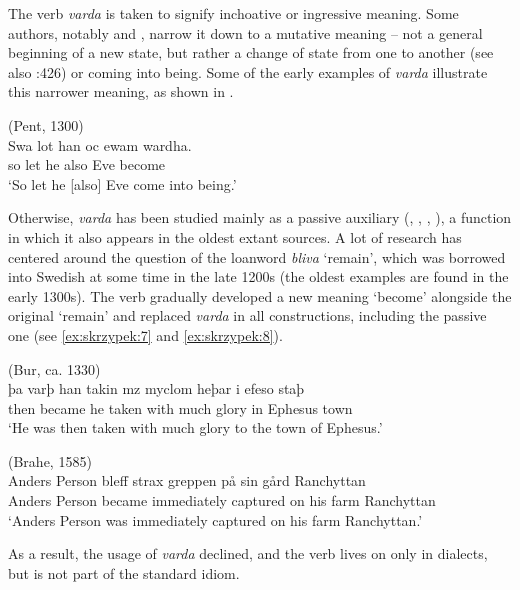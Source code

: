 \documentclass[output=paper,colorlinks,citecolor=brown]{langscibook}
\begin{document}
The verb \textit{varda} is taken to signify inchoative or ingressive meaning. Some authors, notably \citet{Toyota2009} and \citet{Propst2001}, narrow it down to a mutative meaning – not a general beginning of a new state, but rather a change of state from one to another (see also \cite{Denison1993}:426) or coming into being. Some of the early examples of \textit{varda} illustrate this narrower meaning, as shown in . 

\ea \label{ex:skrzypek:6}
    (Pent, 1300)\\
    \gll Swa lot han oc ewam wardha.\\
    so let he also Eve become\\
    \glt ‘So let he [also] Eve come into being.’
\z

Otherwise, \textit{varda} has been studied mainly as a passive auxiliary (\cite{Markey1969}, \cite{Elmevik1970}, \cite{Skrzypek2020}, \cite{Skrzypek2024}), a function in which it also appears in the oldest extant sources. A lot of research has centered around the question of the loanword \textit{bliva} ‘remain’, which was borrowed into Swedish at some time in the late 1200s (the oldest examples are found in the early 1300s). The verb gradually developed a new meaning ‘become’ alongside the original ‘remain’ and replaced \textit{varda} in all constructions, including the passive one (see \ref{ex:skrzypek:7} and \ref{ex:skrzypek:8}). 

\ea \label{ex:skrzypek:7}
    (Bur, ca. 1330)\\
    \gll þa varþ han takin mz myclom heþar i efeso staþ\\
    then became he taken with much glory in Ephesus town\\
    \glt ‘He was then taken with much glory to the town of Ephesus.’
\z

\ea \label{ex:skrzypek:8}
    (Brahe, 1585)\\
    \gll Anders Person bleff strax greppen på sin gård Ranchyttan\\
    Anders Person became immediately captured on his farm Ranchyttan\\
    \glt ‘Anders Person was immediately captured on his farm Ranchyttan.’
\z

As a result, the usage of \textit{varda} declined, and the verb lives on only in dialects, but is not part of the standard idiom. 
\end{document}
